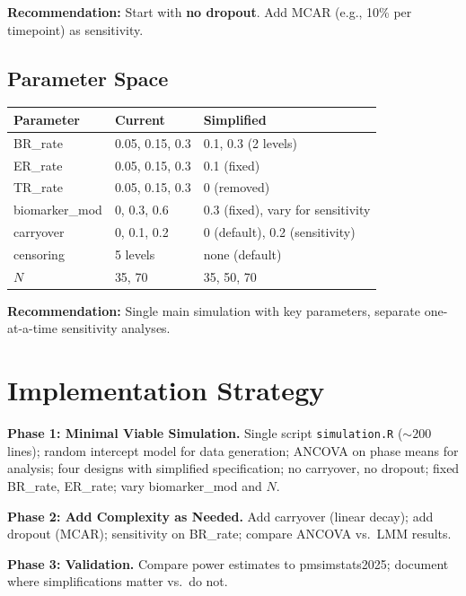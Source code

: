 \documentclass[11pt]{article}
\begin{document}
\textbf{Recommendation:} Start with \textbf{no dropout}. Add MCAR
(e.g., 10\% per timepoint) as sensitivity.


\subsection{Parameter Space}

\begin{table}[h]
\centering\small
\begin{tabular}{@{}lll@{}}
\toprule
Parameter & Current & Simplified \\
\midrule
BR\_rate & 0.05, 0.15, 0.3 & 0.1, 0.3 (2 levels) \\
ER\_rate & 0.05, 0.15, 0.3 & 0.1 (fixed) \\
TR\_rate & 0.05, 0.15, 0.3 & 0 (removed) \\
biomarker\_mod & 0, 0.3, 0.6 & 0.3 (fixed), vary for sensitivity \\
carryover & 0, 0.1, 0.2 & 0 (default), 0.2 (sensitivity) \\
censoring & 5 levels & none (default) \\
$N$ & 35, 70 & 35, 50, 70 \\
\bottomrule
\end{tabular}
\end{table}

\textbf{Recommendation:} Single main simulation with key parameters,
separate one-at-a-time sensitivity analyses.


\section{Implementation Strategy}

\textbf{Phase 1: Minimal Viable Simulation.}
Single script \texttt{simulation.R} (${\sim}200$ lines); random
intercept model for data generation; ANCOVA on phase means for analysis;
four designs with simplified specification; no carryover, no dropout;
fixed BR\_rate, ER\_rate; vary biomarker\_mod and $N$.

\textbf{Phase 2: Add Complexity as Needed.}
Add carryover (linear decay); add dropout (MCAR); sensitivity on
BR\_rate; compare ANCOVA vs.\ LMM results.

\textbf{Phase 3: Validation.}
Compare power estimates to pmsimstats2025; document where
simplifications matter vs.\ do not.
\end{document}

